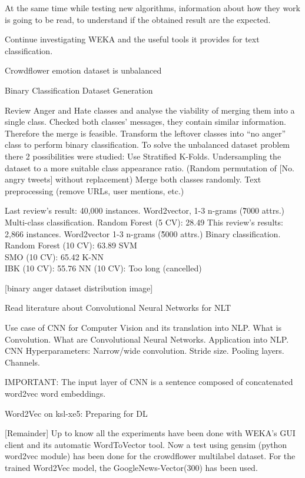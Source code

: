 At the same time while testing new algorithms, information about how they work is going to be read, to understand if the obtained result are the expected.

Continue investigating WEKA and the useful tools it provides for text classification.

Crowdflower emotion dataset is unbalanced

Binary Classification Dataset Generation

Review  Anger and Hate classes and analyse the viability of merging them into a single class.
Checked both classes’ messages, they contain similar information. Therefore the merge is feasible.
Transform the leftover classes into “no anger” class to perform binary classification.
To solve the unbalanced dataset problem there 2 possibilities were studied: 
Use Stratified K-Folds. 
Undersampling the dataset to a more suitable class appearance ratio. (Random permutation of [No. angry tweets] without replacement)
Merge both classes randomly.
Text preprocessing (remove URLs, user mentions, etc.)

Last review’s result:
40,000 instances.
Word2vector, 1-3 n-grams\cite{cavnar1994n} (\~7000 attrs.)
Multi-class classification.
Random Forest (5 CV): 28.49%
This review’s results:
2,866 instances.
Word2vector 1-3 n-grams (\~5000 attrs.)
Binary classification.
Random Forest (10 CV): 63.89%
SVM\\SMO (10 CV): 65.42%
K-NN\\IBK (10 CV): 55.76%
NN (10 CV): Too long (cancelled)

[binary anger dataset distribution image]

Read literature about Convolutional Neural Networks for NLT\cite{cnnDennyBritz}

Use case of CNN for Computer Vision and its translation into NLP.
What is Convolution.
What are Convolutional Neural Networks.
Application into NLP.
CNN Hyperparameters:
Narrow/wide convolution.
Stride size.
Pooling layers.
Channels.

IMPORTANT: The input layer of CNN is a sentence composed of concatenated word2vec word embeddings.

Word2Vec on ksl-xe5: Preparing for DL

[Remainder] Up to know all the experiments have been done with WEKA’s GUI client and its automatic WordToVector tool.
Now a test using gensim (python word2vec module) has been done for the crowdflower multilabel dataset.
For the trained Word2Vec model, the GoogleNews-Vector(300)\cite{googleWord2Vec} has been used.

